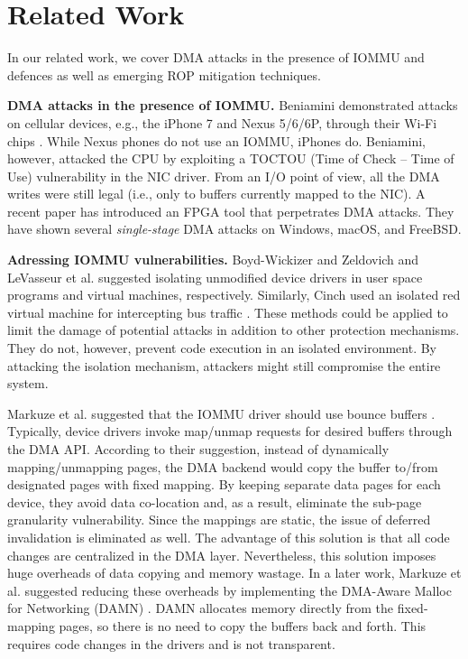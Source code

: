 \section{Related Work}
In our related work, we cover DMA attacks in the presence of IOMMU and defences as well as emerging ROP mitigation techniques.

\smallskip
\noindent\textbf{DMA attacks in the presence of IOMMU.}
Beniamini demonstrated attacks on cellular devices, e.g., the iPhone 7 and Nexus 5/6/6P, through their Wi-Fi chips \cite{Ben17a, Ben17b}. While Nexus phones do not use an IOMMU, iPhones do. Beniamini, however, attacked the CPU by exploiting a TOCTOU (Time of Check – Time of Use) vulnerability in the NIC driver. From an I/O point of view, all the DMA writes were still legal (i.e., only to buffers currently mapped to the NIC). A recent paper \cite{thunder} has introduced an FPGA tool that perpetrates DMA attacks. They have shown several \emph{single-stage} DMA attacks on Windows, macOS, and FreeBSD.

\smallskip
\noindent\textbf{Adressing IOMMU vulnerabilities.}
Boyd-Wickizer and Zeldovich \cite{BWZ10} and LeVasseur et al. \cite{LUSG04} suggested isolating unmodified device drivers in user space programs and virtual machines, respectively. Similarly, Cinch used an isolated red virtual machine for intercepting bus traffic \cite{AWH16}. These methods could be applied to limit the damage of potential attacks in addition to other protection mechanisms. They do not, however, prevent code execution in an isolated environment. By attacking the isolation mechanism, attackers might still compromise the entire system.

Markuze et al. suggested that the IOMMU driver should use bounce buffers \cite{MMT16}. Typically, device drivers invoke map/unmap requests for desired buffers through the DMA API. According to their suggestion, instead of dynamically mapping/unmapping pages, the DMA backend would copy the buffer to/from designated pages with fixed mapping. By keeping separate data pages for each device, they avoid data co-location and, as a result, eliminate the sub-page granularity vulnerability. Since the mappings are static, the issue of deferred invalidation is eliminated as well. The advantage of this solution is that all code changes are centralized in the DMA layer. Nevertheless, this solution imposes huge overheads of data copying and memory wastage. In a later work, Markuze et al. suggested reducing these overheads by implementing the DMA-Aware Malloc for Networking (DAMN) \cite{MSMT18}. DAMN allocates memory directly from the fixed-mapping pages, so there is no need to copy the buffers back and forth. This requires code changes in the drivers and is not transparent.

